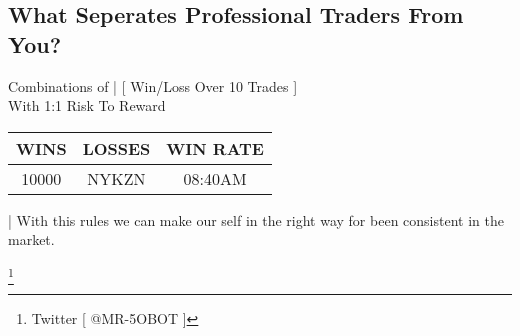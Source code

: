 \documentclass[10pt]{article}
\begin{document}
\renewcommand{\arraystretch}{1.5} %
\setlength{\tabcolsep}{10pt} %

\subsection{What Seperates Professional Traders From You?}
\vspace{0.3cm}
\begin{center}
  \small{Combinations of | [ Win/Loss Over 10 Trades ]} \\
  \small{With 1:1 Risk To Reward}
\end{center}

\begin{center}
\begin{tabular}{|c|c|c|}
  \hline
  WINS & LOSSES & WIN RATE \\ 
  \hline 
  10000 & NYKZN & 08:40AM \\  
  \hline
\end{tabular}
\end{center}
\vspace{0.1cm}


\begin{notesbox}
  \noindent | With this rules we can make our self in the right way for been consistent in the market.
\end{notesbox}


\footnote{Twitter [ @MR-5OBOT ]}
\end{document}
